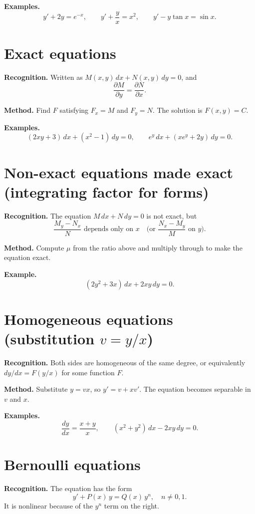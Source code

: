 \documentclass{essay}
\begin{document}
\textbf{Examples.}
\[ y' + 2y = e^{-x}, \qquad y' + \frac{y}{x} = x^{2}, \qquad y' - y\tan x = \sin x. \]

\section{Exact equations}

\textbf{Recognition.}  Written as \(M(x,y)\,dx + N(x,y)\,dy = 0\), and
\[ \frac{\partial M}{\partial y} = \frac{\partial N}{\partial x}. \]

\textbf{Method.}  Find \(F\) satisfying \(F_{x} = M\) and \(F_{y} = N\).  The solution is \(F(x,y) = C\).

\textbf{Examples.}
\[ (2xy + 3)\,dx + (x^{2} - 1)\,dy = 0, \qquad e^{y}\,dx + (xe^{y} + 2y)\,dy = 0. \]

\section{Non-exact equations made exact (integrating factor for forms)}

\textbf{Recognition.}  The equation \(M\,dx + N\,dy = 0\) is not exact, but
\[ \frac{M_{y} - N_{x}}{N} \text{ depends only on } x \quad \text{(or } \frac{N_{x} - M_{y}}{M} \text{ on } y \text{)}. \]

\textbf{Method.}  Compute \(\mu\) from the ratio above and multiply through to make the equation exact.

\textbf{Example.}
\[ (2y^{2} + 3x)\,dx + 2xy\,dy = 0. \]

\section{Homogeneous equations (substitution \(v = y/x\))}

\textbf{Recognition.}  Both sides are homogeneous of the same degree, or equivalently
\(dy/dx = F(y/x)\) for some function \(F\).

\textbf{Method.}  Substitute \(y = vx\), so \(y' = v + xv'\).  The equation becomes separable in \(v\) and \(x\).

\textbf{Examples.}
\[ \frac{dy}{dx} = \frac{x+y}{x}, \qquad (x^{2} + y^{2})\,dx - 2xy\,dy = 0. \]

\section{Bernoulli equations}

\textbf{Recognition.}  The equation has the form
\[ y' + P(x)\,y = Q(x)\,y^{n}, \quad n \neq 0, 1. \]
It is nonlinear because of the \(y^{n}\) term on the right.
\end{document}
